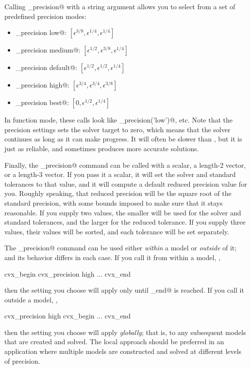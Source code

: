 \documentclass[12pt]{article}
\begin{document}
Calling \verb@cvx_precision@ with a string argument allows you to select from a
set of predefined precision modes:
\begin{itemize}
	\item \verb@cvx_precision low@:      $[ \epsilon^{3/8}, \epsilon^{1/4}, \epsilon^{1/4} ]$
	\item \verb@cvx_precision medium@:   $[ \epsilon^{1/2}, \epsilon^{3/8}, \epsilon^{1/4} ]$
	\item \verb@cvx_precision default@:  $[ \epsilon^{1/2}, \epsilon^{1/2}, \epsilon^{1/4} ]$
	\item \verb@cvx_precision high@:     $[ \epsilon^{3/4}, \epsilon^{3/4}, \epsilon^{3/8} ]$
	\item \verb@cvx_precision best@:     $[ 0, \epsilon^{1/2}, \epsilon^{1/4} ]$
\end{itemize}
In function mode, these calls look like \verb@cvx_precision('low')@, etc. Note
that the \verb@best@ precision settings sets the solver target to zero, which
means that the solver continues as long as it can make progress. It will often
be slower than \verb@default@, but it is just as reliable, and sometimes produces
more accurate solutions.

Finally, the \verb@cvx_precision@ command can be called with a scalar,
a length-2 vector, or a length-3 vector.
If you pass it a scalar, it will set the solver and standard tolerances
to that value, and it will compute a default reduced precision value for you.
Roughly speaking, that reduced precision will be the square root of the standard
precision, with some bounds imposed to make sure that it stays reasonable. If
you supply two values, the smaller will be used for the 
solver and standard tolerances, and the larger for the reduced tolerance.
If you supply three values, their values will be sorted, and each
tolerance will be set separately.

The \verb@cvx_precision@ command can be used either \emph{within} a \cvx model or
\emph{outside} of it; and its behavior differs in each case. If you call it from
within a model, \eg,
\begin{code}
	cvx_begin
	    cvx_precision high
	    ...
	cvx_end
\end{code}
then the setting you choose will apply only until \verb@cvx_end@ is reached. If you call it outside
a model, \eg,
\begin{code}
	cvx_precision high
	cvx_begin
	    ...
	cvx_end
\end{code}
then the setting you choose will apply \emph{globally}; that is, to any
subsequent models that are created and solved. The local approach should be
preferred in an application where multiple models are constructed and solved
at different levels of precision.
\end{document}
